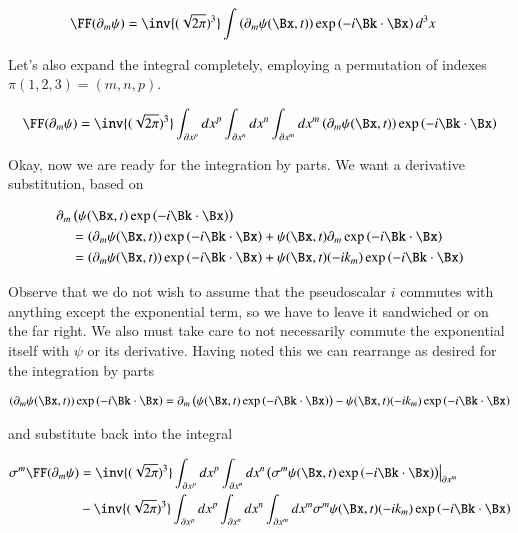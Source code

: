 \begin{align*}
\FF(\partial_m \psi) 
&= \inv{(\sqrt{2\pi})^3} \int \left(\partial_m \psi(\Bx, t)\right) \exp\left( -i \Bk \cdot \Bx \right) d^3 x 
\end{align*}

Let's also expand the integral completely, employing a permutation of indexes $\pi(1,2,3) = (m,n,p)$.

\begin{align*}
\FF(\partial_m \psi) 
&= 
\inv{(\sqrt{2\pi})^3} 
\int_{\partial x^p} dx^p
\int_{\partial x^n} dx^n
\int_{\partial x^m} dx^m
\left(\partial_m \psi(\Bx, t)\right) \exp\left( -i \Bk \cdot \Bx \right) \\
\end{align*}

Okay, now we are ready for the integration by parts.  We want a derivative substitution, based on

\begin{align*}
\partial_m &\left( \psi(\Bx, t) \exp\left( -i \Bk \cdot \Bx \right) \right) \\
&= (\partial_m \psi(\Bx, t)) \exp\left( -i \Bk \cdot \Bx \right) + \psi(\Bx, t) \partial_m \exp\left( -i \Bk \cdot \Bx \right) \\
&= (\partial_m \psi(\Bx, t)) \exp\left( -i \Bk \cdot \Bx \right) + \psi(\Bx, t) ( -i k_m ) \exp\left( -i \Bk \cdot \Bx \right) \\
\end{align*}

Observe that we do not wish to assume that the pseudoscalar $i$ commutes with anything except the exponential term, so we have to leave
it sandwiched or on the far right.  We also must take care to not necessarily commute the exponential itself with $\psi$ or its derivative.
Having noted this we can rearrange as desired for the integration by parts

\begin{align*}
(\partial_m \psi(\Bx, t)) \exp\left( -i \Bk \cdot \Bx \right)
&=
\partial_m \left( \psi(\Bx, t) \exp\left( -i \Bk \cdot \Bx \right) \right) - \psi(\Bx, t) ( -i k_m ) \exp\left( -i \Bk \cdot \Bx \right) \\
\end{align*}

and substitute back into the integral

\begin{align*}
\sigma^m \FF(\partial_m \psi) 
&= 
\inv{(\sqrt{2\pi})^3} 
\int_{\partial x^p} dx^p
\int_{\partial x^n} dx^n
{\left. {\left(\sigma^m \psi(\Bx, t) \exp\left( -i \Bk \cdot \Bx \right) \right)} \right\vert}_{\partial x^m} \\
&- 
\inv{(\sqrt{2\pi})^3} 
\int_{\partial x^p} dx^p
\int_{\partial x^n} dx^n
\int_{\partial x^m} dx^m
\sigma^m \psi(\Bx, t) ( -i k_m )
\exp\left( -i \Bk \cdot \Bx \right) 
\\
\end{align*}

